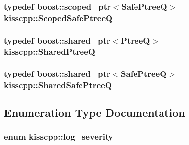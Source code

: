 \hypertarget{namespacekisscpp_a20653e6629a85affc6a1b8529e0a8da0}{
\subsubsection[{Scoped\-Safe\-Ptree\-Q}]{\setlength{\rightskip}{0pt plus 5cm}typedef boost\-::scoped\-\_\-ptr$<${\bf Safe\-Ptree\-Q}$>$ {\bf kisscpp\-::\-Scoped\-Safe\-Ptree\-Q}}}\label{namespacekisscpp_a20653e6629a85affc6a1b8529e0a8da0}
\hypertarget{namespacekisscpp_aecf9f29bb4c41e0d4dbc74731a3020cd}{
\subsubsection[{Shared\-Ptree\-Q}]{\setlength{\rightskip}{0pt plus 5cm}typedef boost\-::shared\-\_\-ptr$<${\bf Ptree\-Q}$>$ {\bf kisscpp\-::\-Shared\-Ptree\-Q}}}\label{namespacekisscpp_aecf9f29bb4c41e0d4dbc74731a3020cd}
\hypertarget{namespacekisscpp_ae95e969e7f5dfd1f36842ac9aa25c7ea}{
\subsubsection[{Shared\-Safe\-Ptree\-Q}]{\setlength{\rightskip}{0pt plus 5cm}typedef boost\-::shared\-\_\-ptr$<${\bf Safe\-Ptree\-Q}$>$ {\bf kisscpp\-::\-Shared\-Safe\-Ptree\-Q}}}\label{namespacekisscpp_ae95e969e7f5dfd1f36842ac9aa25c7ea}


\subsection{Enumeration Type Documentation}
\hypertarget{namespacekisscpp_a2479a56cdedf21357ca5c68adc699d00}{
\subsubsection[{log\-\_\-severity}]{\setlength{\rightskip}{0pt plus 5cm}enum {\bf kisscpp\-::log\-\_\-severity}}}\label{namespacekisscpp_a2479a56cdedf21357ca5c68adc699d00}


